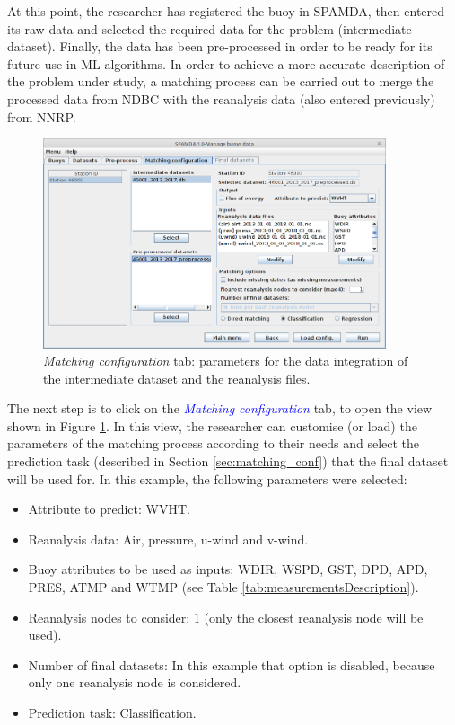 \documentclass[energies,article,submit,moreauthors,pdftex]{Definitions/mdpi}
\begin{document}
			At this point, the researcher has registered the buoy in SPAMDA, then entered its raw data and selected the required data for the problem (intermediate dataset). Finally, the data has been pre-processed in order to be ready for its future use in ML algorithms. In order to achieve a more accurate description of the problem under study, a matching process can be carried out to merge the processed data from NDBC with the reanalysis data (also entered previously) from NNRP.
			
			\begin{figure}[ht!]
				\centering
				\includegraphics[width=0.90\textwidth]{figures/FigureMatching_configuration.png}
				\caption{\textit{Matching configuration} tab: parameters for the data integration of the intermediate dataset and the reanalysis files.}\label{fig:matching_conf}
			\end{figure}
			
			The next step is to click on the \textcolor{blue}{\textit{Matching configuration}} tab, to open the view shown in  Figure \ref{fig:matching_conf}. In this view, the researcher can customise (or load) the parameters of the matching process according to their needs and select the prediction task  (described in Section \ref{sec:matching_conf}) that the final dataset will be used for. In this example, the following parameters were selected:
			\begin{itemize}
				\item Attribute to predict: WVHT.
				\item Reanalysis data: Air, pressure, u-wind and v-wind.
				\item Buoy attributes to be used as inputs: WDIR, WSPD, GST, DPD, APD, PRES, ATMP and WTMP (see Table \ref{tab:measurementsDescription}).
				\item Reanalysis nodes to consider: $1$ (only the closest reanalysis node will be used).
				\item Number of final datasets: In this example that option is disabled, because only one reanalysis node is considered.
				\item Prediction task: Classification.
			\end{itemize} 
			
\end{document}
